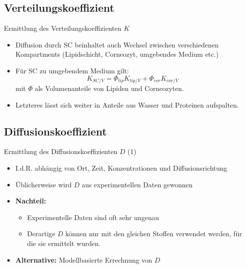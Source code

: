 \documentclass[utf8x,compress,professionalfonts]{beamer}
\begin{document}
\subsection{Verteilungskoeffizient}
\begin{frame}{Ermittlung des Verteilungskoeffizienten $K$}
  \begin{itemize}
    \item Diffusion durch SC beinhaltet auch Wechsel zwischen verschiedenen Kompartments
      (Lipidschicht, Corneozyt, umgebendes Medium etc.)
      \bigskip
    \item F\"ur SC zu umgebendem Medium gilt:
      $$K_{SC/V} = \Phi_{lip}K_{lip/V} + \Phi_{cor}K_{cor/V}$$
      mit $\Phi$ als Volumenanteile von Lipiden und Corneozyten.
      \bigskip
    \item Letzteres l\"asst sich weiter in Anteile aus Wasser und Proteinen
      aufspalten.
  \end{itemize}
\end{frame}

\subsection{Diffusionskoeffizient}
\begin{frame}{Ermittlung des Diffusionskoeffizienten $D$ (1)}
  \begin{itemize}
    \item I.d.R. abh\"angig von Ort, Zeit, Konzentrationen und Diffusionsrichtung
      \bigskip
    \item \"Ublicherweise wird $D$ aus experimentellen Daten gewonnen
      \bigskip
    \item<2-> \textbf{Nachteil:}
      \begin{itemize}
        \item Experimentelle Daten sind oft sehr ungenau
        \item Derartige $D$ k\"onnen nur mit den gleichen Stoffen verwendet werden,
          f\"ur die sie ermittelt wurden.
      \end{itemize}
      \bigskip
    \item<3-> \textbf{Alternative:} Modellbasierte Errechnung von $D$
  \end{itemize}
\end{frame}
\end{document}
